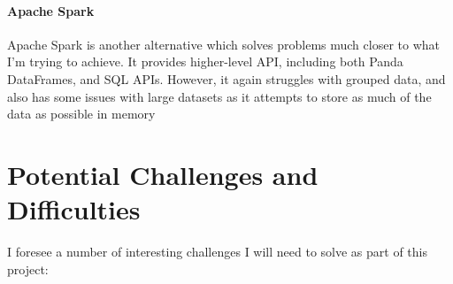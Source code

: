 \documentclass[12pt]{article}
\begin{document}
	\paragraph{Apache Spark} 
	Apache Spark \cite{zaharia2016apache} is another alternative which solves problems much closer to what I'm trying to achieve. It provides higher-level API, including both Panda DataFrames, and SQL APIs. However, it again struggles with grouped data, and also has some issues with large datasets as it attempts to store as much of the data as possible in memory
	
	\section{Potential Challenges and Difficulties}
	
	I foresee a number of interesting challenges I will need to solve as part of this project:
	
\end{document}
